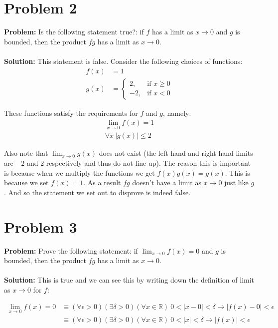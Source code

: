 \documentclass{article}
\begin{document}
\section*{Problem 2}
\textbf{Problem:} Is the following statement true?: if $f$ has a limit as $x\to 0$ and $g$ is bounded, then the product $fg$ has a limit as $x\to 0$.
\\\\
\textbf{Solution:} This statement is false. Consider the following choices of functions:
\begin{align*}
  f(x)&=1\\
  g(x)&=\begin{cases}
    2, &\text{if } x\ge 0\\
    -2, & \text{if }x<0
  \end{cases}
\end{align*}

These functions satisfy the requirements for $f$ and $g$, namely:
\begin{align*}
  \lim_{x\to0}f(x)=1\tag{limit exists}\\
  \forall x\ |g(x)|\le 2\tag{$g$ is bounded}
\end{align*}

Also note that $\lim_{x\to0}g(x)$ does not exist (the left hand and right hand limits are $-2$ and $2$ respectively and thus do not line up). The reason this is important is because when we multiply the functions we get $f(x)g(x)=g(x)$. This is because we set $f(x)=1$. As a result $fg$ doesn't have a limit as $x\to0$ just like $g$. And so the statement we set out to disprove is indeed false.

\section*{Problem 3}
\textbf{Problem:} Prove the following statement: if $\lim_{x\to 0}f(x)=0$ and $g$ is bounded, then the product $fg$ has a limit as $x\to 0$.
\\\\
\textbf{Solution:} This is true and we can see this by writing down the definition of limit as $x\to 0$ for $f$:

\begin{align*}
\lim_{x\to 0}f(x)=0&\equiv(\forall\epsilon>0)(\exists\delta>0)(\forall x\in\mathbb R)\ 0<|x-0|<\delta\rightarrow|f(x)-0|<\epsilon\\
&\equiv(\forall\epsilon>0)(\exists\delta>0)(\forall x\in\mathbb R)\ 0<|x|<\delta\rightarrow|f(x)|<\epsilon
\end{align*}
\end{document}
